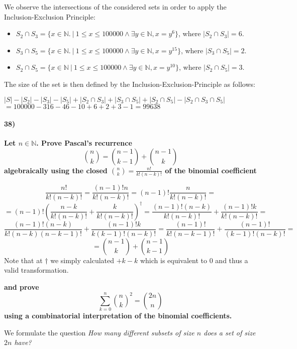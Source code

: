 \documentclass[
]{article}
\begin{document}
We observe the intersections of the considered sets in order to apply
the Inclusion-Exclusion Principle:

\begin{itemize}
\item
  \(S_2 \cap S_3 = \{x \in \mathbb{N} . \ | \ 1 \leq x \leq 100 000 \land \exists y \in \mathbb{N}, x = y^6\}\),
  where \(|S_2 \cap S_3| = 6\).
\item
  \(S_3 \cap S_5 = \{x \in \mathbb{N} . \ | \ 1 \leq x \leq 100 000 \land \exists y \in \mathbb{N}, x = y^{15}\}\),
  where \(|S_3 \cap S_5| = 2\).
\item
  \(S_2 \cap S_5 = \{x \in \mathbb{N} \ | \ 1 \leq x \leq 100 000 \land \exists y \in \mathbb{N}, x = y^{10}\}\),
  where \(|S_2 \cap S_5| = 3\).
\end{itemize}

The size of the set is then defined by the Inclusion-Exclusion-Principle
as follows:

\(|S| - |S_2| - |S_3| - |S_5| + |S_2 \cap S_3| + |S_3 \cap S_5| + |S_2 \cap S_5| - |S_2 \cap S_3 \cap S_5|\)
\(= 100 000 - 316 - 46 - 10 + 6 + 2 + 3 - 1 = 99638\)

\hypertarget{section-1}{%
\paragraph{38)}\label{section-1}}

\textbf{Let \(n \in \mathbb{N}\). Prove Pascal's recurrence \[
\binom{n}{k} = \binom{n-1}{k-1} + \binom{n-1}{k}
\] algebraically using the closed \(\binom{n}{k} = \frac{n!}{k!(n-k)!}\)
of the binomial coefficient}

\[
\frac{n!}{k!(n-k)!} = \frac{(n-1)!n}{k!(n-k)!} = (n-1)! \frac{n}{k!(n-k)!} =
\]
\[= (n-1)! \left( \frac{n-k}{k!(n-k)!} + \frac{k}{k!(n-k)!} \right)^\dagger = \frac{(n-1)!(n-k)}{k!(n-k)!} + \frac{(n-1)!k}{k!(n-k)!} =\]
\[
\frac{(n-1)!(n-k)}{k!(n-k)(n-k-1)!} + \frac{(n-1)!k}{k(k-1)!(n-k)!} = \frac{(n-1)!}{k!(n-k-1)!} + \frac{(n-1)!}{(k-1)!(n-k)!}=
\] \[
= \binom{n-1}{k} + \binom{n-1}{k-1}
\] Note that at \(\dagger\) we simply calculated \(+k-k\) which is
equivalent to \(0\) and thus a valid transformation.

\textbf{and prove \[
\sum_{k=0}^n \binom{n}{k}^2 = \binom{2n}{n}
\] using a combinatorial interpretation of the binomial coefficients.}

We formulate the question \emph{How many different subsets of size \(n\)
does a set of size \(2n\) have?}
\end{document}
